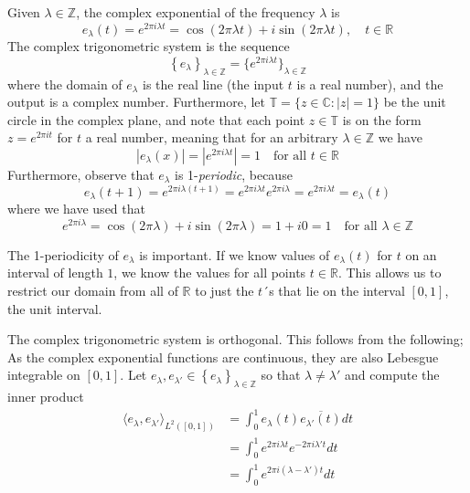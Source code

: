 \documentclass[../thesis.tex]{subfiles}
\begin{document}
Given $\lambda \in \mathbb{Z}$, the complex exponential of the frequency $\lambda$ is 
\begin{equation}
    e_{\lambda}(t) = e^{2 \pi i \lambda t} = \cos{(2 \pi \lambda t)} + i \sin{(2 \pi \lambda t)}, \quad t\in \mathbb{R}    
\end{equation}
The complex trigonometric system is the sequence
\begin{equation}
    \left\{ e_{\lambda} \right\}_{\lambda\in \mathbb{Z}} = \{ e^{2 \pi i \lambda t} \}_{\lambda \in \mathbb{Z}}    
\end{equation}
where the domain of $e_\lambda$ is the real line (the input $t$ is a real number), and the output is a complex number. Furthermore, let $\mathbb{T}=\{z\in \mathbb{C} : |z|=1\}$ be the unit circle in the complex plane, and note that each point $z\in\mathbb{T}$ is on the form $z=e^{2 \pi i t}$ for $t$ a real number, meaning that for an arbitrary $\lambda \in \mathbb{Z}$ we have
\begin{equation}
    \left|e_{\lambda}(x) \right|= |e^{2 \pi i \lambda t} | = 1 \quad \text{for all } t\in \mathbb{R} 
\end{equation}
Furthermore, observe that $e_\lambda$ is 1-\emph{periodic}, because
\begin{equation}
    e_\lambda(t+1) = e^{2 \pi i \lambda (t+1)} = e^{2 \pi i \lambda t} e^{2 \pi i \lambda} = e^{2 \pi i \lambda t} = e_\lambda(t)
\end{equation}
where we have used that
\begin{equation}
    e^{2 \pi i \lambda} = \cos(2 \pi \lambda) + i \sin(2 \pi \lambda) = 1+i0 = 1 \quad \text{for all } \lambda \in \mathbb{Z} 
\end{equation}

The 1-periodicity of $e_\lambda$ is important. If we know values of $e_\lambda(t)$ for $t$ on an interval of length $1$, we know the values for all points $t\in \mathbb{R}$. This allows us to restrict our domain from all of $\mathbb{R}$ to just the $t$´s that lie on the interval $[0,1]$, the unit interval.

The complex trigonometric system is orthogonal. This follows from the following; As the complex exponential functions are continuous, they are also Lebesgue integrable on $[0,1]$. Let $e_{\lambda}, e_{\lambda'} \in \left\{ e_{\lambda} \right\}_{\lambda\in \mathbb{Z}}$ so that $\lambda \neq \lambda'$ and compute the inner product
\begin{align*} 
\langle e_{\lambda},e_{\lambda'} \rangle_{L^2([0,1])} 
&= \int_0^1 e_{\lambda}(t)\overline{e_{\lambda'}(t)} dt\\ &= \int_0^1 e^{2 \pi i {\lambda}t} e^{-2 \pi i {\lambda'}t} dt\\
&= \int_0^1 e^{2 \pi i (\lambda-\lambda')t} dt
\end{align*}
\end{document}

